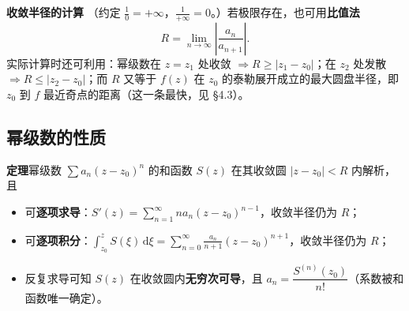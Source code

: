\textbf{收敛半径的计算}
（约定 \(\frac{1}{0}=+\infty\)，\(\frac{1}{+\infty}=0\)。）若极限存在，也可用\textbf{比值法}
\[
R=\lim_{n\to\infty}\left|\frac{a_{n}}{a_{n+1}}\right|.
\]
实际计算时还可利用：幂级数在 \(z=z_{1}\) 处收敛 \(\Rightarrow R\geqslant|z_{1}-z_{0}|\)；在 \(z_{2}\) 处发散 \(\Rightarrow R\leqslant|z_{2}-z_{0}|\)；而 \(R\) 又等于 \(f(z)\) 在 \(z_{0}\) 的泰勒展开成立的最大圆盘半径，即 \(z_{0}\) 到 \(f\) 最近奇点的距离（这一条最快，见 §4.3）。


\subsection{幂级数的性质}
\textbf{定理}\quad 幂级数 \(\sum a_{n}(z-z_{0})^{n}\) 的和函数 \(S(z)\) 在其收敛圆 \(|z-z_{0}|<R\) 内解析，且
\begin{itemize}[leftmargin=2em]
  \item 可\textbf{逐项求导}：\(S'(z)=\sum\limits_{n=1}^{\infty}na_{n}(z-z_{0})^{n-1}\)，收敛半径仍为 \(R\)；
  \item 可\textbf{逐项积分}：\(\displaystyle\int_{z_{0}}^{z}S(\xi)\,\mathrm{d}\xi=\sum_{n=0}^{\infty}\frac{a_{n}}{n+1}(z-z_{0})^{n+1}\)，收敛半径仍为 \(R\)；
  \item 反复求导可知 \(S(z)\) 在收敛圆内\textbf{无穷次可导}，且 \(a_{n}=\dfrac{S^{(n)}(z_{0})}{n!}\)（系数被和函数唯一确定）。
\end{itemize}

